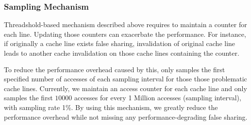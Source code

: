 \subsubsection{Sampling Mechanism}
Threadshold-based mechanism described above requires to maintain a counter for each
line. Updating those counters 
can exacerbate the performance. For instance, if originally a cache line exists false
sharing, invalidation of original cache line leads to another cache invalidation on
those cache lines containing the counter.


To reduce the performance overhead caused by this,  only samples the first specified
number of accesses of each sampling interval for those those problematic cache lines. 
Currently, we maintain an access counter for each cache line and only samples the first $10000$ accesses 
for every 1 Million accesses (sampling interval), with sampling rate 1\%. By using this mechanism, 
we greatly reduce the performance overhead while not missing any performance-degrading false sharing.  

